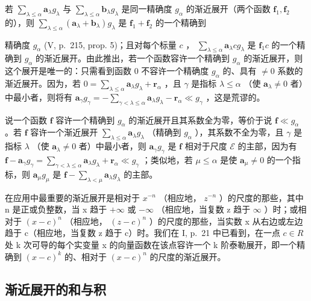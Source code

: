若 \(\sum_{\lambda \leqslant \alpha} \mathbf{a}_{\lambda} g_{\lambda}\) 与 \(\sum_{\lambda \leqslant \alpha} \mathbf{b}_{\lambda} g_{\lambda}\) 是同一精确度 \(g_{\alpha}\) 的渐近展开（两个函数 \(\mathbf{f}_1, \mathbf{f}_2\) 的），则 \(\sum_{\lambda \leqslant \alpha} (\mathbf{a}_{\lambda} + \mathbf{b}_{\lambda}) g_{\lambda}\) 是 \(\mathbf{f}_1 + \mathbf{f}_2\) 的一个精确到

精确度 \(g_{\alpha}\) (V, p.~215, prop. 5)；且对每个标量 \(c\) ， \(\sum_{\lambda \leqslant \alpha} \mathbf{a}_{\lambda}cg_{\lambda}\) 是 \(\mathbf{f}_1c\) 的一个精确到 \(g_{\alpha}\) 的渐近展开。由此推出，若一个函数容许一个精确到 \(g_{\alpha}\) 的渐近展开，则这个展开是唯一的：只需看到函数 0 不容许一个精确度 \(g_{\alpha}\) 的、具有 \(\neq 0\) 系数的渐近展开。因为，若 \(0 = \sum_{\lambda \leqslant \alpha} \mathbf{a}_{\lambda}g_{\lambda} + \mathbf{r}_{\alpha}\) ，且 \(\gamma\) 是指标 \(\lambda \leqslant \alpha\) （使 \(\mathbf{a}_{\lambda} \neq 0\) 者）中最小者，则将有 \(\mathbf{a}_{\gamma}g_{\gamma} = -\sum_{\gamma < \lambda \leqslant \alpha} \mathbf{a}_{\lambda}g_{\lambda} - \mathbf{r}_{\alpha} \ll g_{\gamma}\) ，这是荒谬的。

说一个函数 \(\mathbf{f}\) 容许一个精确到 \(g_{\alpha}\) 的渐近展开且其系数全为零，等价于说 \(\mathbf{f} \ll g_{\alpha}\) 。若 \(\mathbf{f}\) 容许一个渐近展开 \(\sum_{\lambda \leqslant \alpha} \mathbf{a}_{\lambda} g_{\lambda}\) （精确到 \(g_{\alpha}\) ），其系数不全为零，且 \(\gamma\) 是指标 \(\lambda\) （使 \(\mathbf{a}_{\lambda} \neq 0\) 者）中最小者，则 \(\mathbf{a}_{\gamma} g_{\gamma}\) 是 \(\mathbf{f}\) 相对于尺度 \(\mathcal{E}\) 的主部，因为有 \(\mathbf{f} - \mathbf{a}_{\gamma} g_{\gamma} = \sum_{\gamma < \lambda \leqslant \alpha} \mathbf{a}_{\lambda} g_{\lambda} + \mathbf{r}_{\alpha} \ll g_{\gamma}\) ；类似地，若 \(\mu \leqslant \alpha\) 是使 \(\mathbf{a}_{\mu} \neq 0\) 的一个指标，则 \(\mathbf{a}_{\mu} g_{\mu}\) 是 \(\mathbf{f} - \sum_{\lambda < \mu} \mathbf{a}_{\lambda} g_{\lambda}\) 的主部。

在应用中最重要的渐近展开是相对于 \(x^{-n}\) （相应地， \(z^{-n}\) ）的尺度的那些，其中 n 是正或负整数，当 x 趋于 \(+\infty\) 或 \(-\infty\) （相应地，当复数 z 趋于 \(\infty\) ）时；或相对于 \((x - c)^{n}\) （相应地， \((z - c)^{n}\) ）的尺度的那些，当实数 x 从右边或左边趋于 c（相应地，当复数 z 趋于 c）时。我们在 I, p.~21 中已看到，在一点 \(c \in R\) 处 k 次可导的每个实变量 x 的向量函数在该点容许一个 k 阶泰勒展开，即一个精确到 \((x - c)^{k}\) 的、相对于 \((x - c)^{n}\) 的尺度的渐近展开。

\subsection{渐近展开的和与积}

